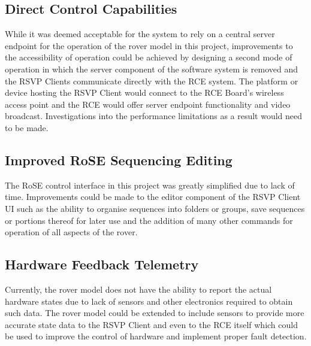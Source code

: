    \subsection{Direct Control Capabilities}
      While it was deemed acceptable for the system to rely on a central server endpoint for the operation of the rover model in this project, improvements to the accessibility of operation could be achieved by designing a second mode of operation in which the server component of the software system is removed and the RSVP Clients communicate directly with the RCE system. The platform or device hosting the RSVP Client would connect to the RCE Board's wireless access point and the RCE would offer server endpoint functionality and video broadcast. Investigations into the performance limitations as a result would need to be made.
      
    \subsection{Improved RoSE Sequencing Editing}
      The RoSE control interface in this project was greatly simplified due to lack of time. Improvements could be made to the editor component of the RSVP Client UI such as the ability to organise sequences into folders or groups, save sequences or portions thereof for later use and the addition of many other commands for operation of all aspects of the rover.
    
    \subsection{Hardware Feedback Telemetry}
      Currently, the rover model does not have the ability to report the actual hardware states due to lack of sensors and other electronics required to obtain such data. The rover model could be extended to include sensors to provide more accurate state data to the RSVP Client and even to the RCE itself which could be used to improve the control of hardware and implement proper fault detection.